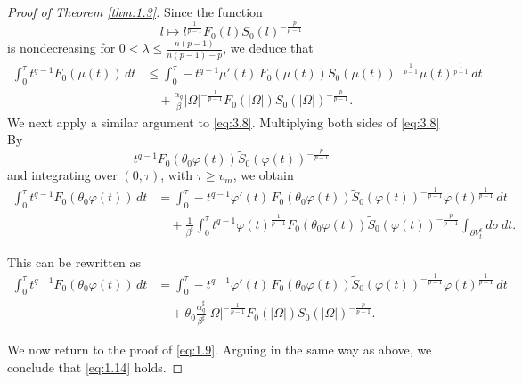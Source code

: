 \documentclass[10pt,a4paper]{amsart}
\begin{document}
\begin{proof}[Proof of Theorem \ref{thm:1.3}]
Since the function
\[
l \mapsto l^{\frac{1}{p-1}} F_0(l) S_0(l)^{-\frac{p}{p-1}}
\]
is nondecreasing for
$0 < \lambda \le \frac{n(p-1)}{n(p-1)-p}$,
we deduce that
\begin{align*}
\int_0^\tau t^{q-1} F_0(\mu(t))\,dt
&\le
\int_0^\tau -t^{q-1}\mu'(t)\, F_0(\mu(t)) S_0(\mu(t))^{-\frac{1}{p-1}}
\mu(t)^{\frac{1}{p-1}}\,dt \\
&\quad +
\frac{\alpha_q}{\beta}
|\Omega|^{-\frac{1}{p-1}}
F_0(|\Omega|)
S_0(|\Omega|)^{-\frac{p}{p-1}}.
\end{align*}
We next apply a similar argument to \eqref{eq:3.8}. Multiplying both sides of \eqref{eq:3.8} By
\[
t^{q-1} F_0(\theta_0 \varphi(t)) \tilde{S}_0(\varphi(t))^{-\frac{p}{p-1}}
\]
and integrating over $(0,\tau)$, with $\tau \ge v_m$, we obtain
\begin{align*}
\int_0^\tau t^{q-1} F_0(\theta_0\varphi(t))\,dt
&=
\int_0^\tau -t^{q-1}\varphi'(t)\,F_0(\theta_0\varphi(t))
\tilde{S}_0(\varphi(t))^{-\frac{1}{p-1}}
\varphi(t)^{\frac{1}{p-1}}\,dt \\
&\quad +
\frac{1}{\beta^\sharp}
\int_0^\tau t^{q-1}\varphi(t)^{\frac{1}{p-1}}
F_0(\theta_0\varphi(t))
\tilde{S}_0(\varphi(t))^{-\frac{p}{p-1}}
\int_{\partial V_t^e} d\sigma\,dt.
\end{align*}

This can be rewritten as
\begin{align*}
\int_0^\tau t^{q-1} F_0(\theta_0\varphi(t))\,dt
&=
\int_0^\tau -t^{q-1}\varphi'(t)\,F_0(\theta_0\varphi(t))
\tilde{S}_0(\varphi(t))^{-\frac{1}{p-1}}
\varphi(t)^{\frac{1}{p-1}}\,dt \\
&\quad +
\theta_0
\frac{\alpha_q^\sharp}{\beta^\sharp}
|\Omega|^{-\frac{1}{p-1}}
F_0(|\Omega|)
S_0(|\Omega|)^{-\frac{p}{p-1}}.
\end{align*}

We now return to the proof of \eqref{eq:1.9}. Arguing in the same way as above, we conclude that \eqref{eq:1.14} holds.
\end{proof}
\end{document}
